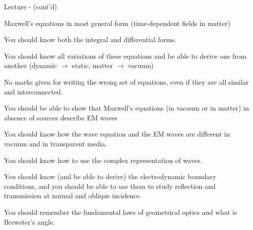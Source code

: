 \begin{frame}{Lecture \summarizedlecture - \lecturesummarytitle (cont'd)}

\begin{itemize}
{\small
\item Maxwell's equations in most general form (time-dependent fields in matter)
    \begin{itemize}
     {\scriptsize
          \item You should know both the integral and differential forms.
          \item You should know all variations of these equations and be able to derive
                    one from another (dynamic $\rightarrow$ static, matter $\rightarrow$ vacuum)
          \item No marks given for writing the wrong set of equations, even if they are all
                    similar and interconnected.\\
    }
    \end{itemize}

\item You should be able to show that Maxwell's equations (in vacuum or in matter) in
          absence of sources describe EM waves

\item You should know how the wave equation and the EM waves are different in vacuum and in transparent media.

\item You should know how to use the complex representation of waves.

\item You should know (and be able to derive) the electrodynamic boundary conditions,
          and you should be able to use them to study reflection and transmission at normal and oblique incidence.

\item You should remember the fundamental laws of geometrical optics and what is Brewster's angle.
}
\end{itemize}

\end{frame}
